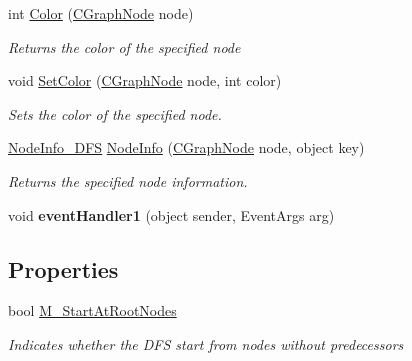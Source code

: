 \begin{DoxyCompactItemize}
\item 
int \hyperlink{class_graph_library_1_1_aglorithms_1_1_g_alg___node_oriented_d_f_s_a33ee93fab673a0093497d2841fefb78d}{Color} (\hyperlink{class_graph_library_1_1_c_graph_node}{C\+Graph\+Node} node)
\begin{DoxyCompactList}\small\item\em Returns the color of the specified node \end{DoxyCompactList}\item 
void \hyperlink{class_graph_library_1_1_aglorithms_1_1_g_alg___node_oriented_d_f_s_aa6194f3209502e02fe32cd088a1d7e45}{Set\+Color} (\hyperlink{class_graph_library_1_1_c_graph_node}{C\+Graph\+Node} node, int color)
\begin{DoxyCompactList}\small\item\em Sets the color of the specified node. \end{DoxyCompactList}\item 
\hyperlink{class_graph_library_1_1_aglorithms_1_1_node_info___d_f_s}{Node\+Info\+\_\+\+D\+F\+S} \hyperlink{class_graph_library_1_1_aglorithms_1_1_g_alg___node_oriented_d_f_s_a55ad5132fce2173810b363f088f70003}{Node\+Info} (\hyperlink{class_graph_library_1_1_c_graph_node}{C\+Graph\+Node} node, object key)
\begin{DoxyCompactList}\small\item\em Returns the specified node information. \end{DoxyCompactList}\item 
\hypertarget{class_graph_library_1_1_aglorithms_1_1_g_alg___node_oriented_d_f_s_a10c4c01856895ec203cb5564169f38e0}{}void {\bfseries event\+Handler1} (object sender, Event\+Args arg)\label{class_graph_library_1_1_aglorithms_1_1_g_alg___node_oriented_d_f_s_a10c4c01856895ec203cb5564169f38e0}

\end{DoxyCompactItemize}
\subsection*{Properties}
\begin{DoxyCompactItemize}
\item 
bool \hyperlink{class_graph_library_1_1_aglorithms_1_1_g_alg___node_oriented_d_f_s_a7926a5bacfd6a50547e8848ead5b5a68}{M\+\_\+\+Start\+At\+Root\+Nodes}
\begin{DoxyCompactList}\small\item\em Indicates whether the D\+F\+S start from nodes without predecessors \end{DoxyCompactList}\end{DoxyCompactItemize}
